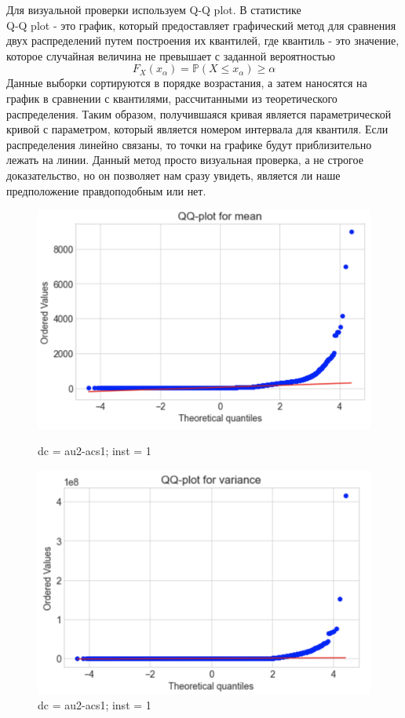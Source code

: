 \documentclass[14pt, a4paper]{extarticle}
\renewcommand{\leq}{\leqslant}
\renewcommand{\geq}{\geqslant}
\begin{document}
	Для визуальной проверки используем Q-Q plot. В статистике \\ Q-Q  plot - это график, который предоставляет графический метод для сравнения двух распределений путем построения их квантилей, где квантиль - это  значение, которое случайная величина не превышает с заданной вероятностью
	$$F_X(x_{\alpha})= \mathbb{P}(X \leq x_{\alpha})\geq\alpha$$
	Данные выборки сортируются в порядке возрастания, а затем наносятся на график в сравнении с квантилями, рассчитанными из теоретического распределения. Таким образом, получившаяся кривая является параметрической кривой с параметром, который является номером интервала для квантиля. Если распределения линейно связаны, то точки на графике будут приблизительно лежать на линии. Данный метод просто визуальная проверка, а не строгое доказательство, но он позволяет нам сразу увидеть, является ли наше предположение правдоподобным или нет.
	\begin{figure}[!htb]
		\includegraphics[width=\linewidth]{figures/qq_mean.png}
		\caption{dc = au2-acs1; inst = 1}
		\endminipage\hfill
		\includegraphics[width=\linewidth]{figures/qq_variance.png}
		\caption{dc = au2-acs1; inst = 1}
		\endminipage
	\end{figure}
	
\end{document}
